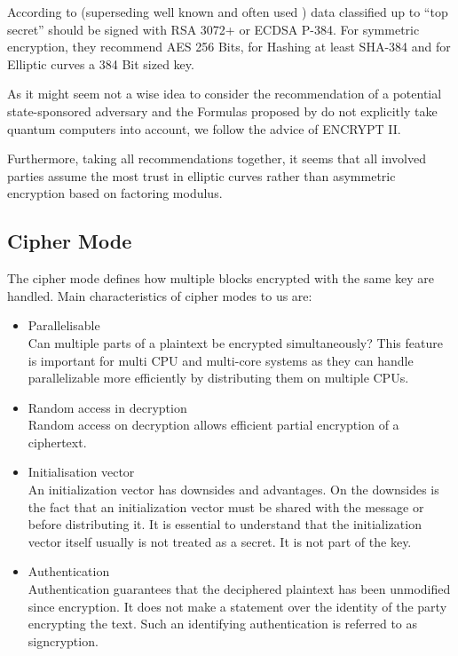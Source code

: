 According to \cite{CNSASuite} (superseding well known and often used \cite{nsa-fact-sheet-B}) data classified up to ``top secret'' should be signed with RSA 3072+ or ECDSA P-384.  For symmetric encryption, they recommend AES 256 Bits, for Hashing at least SHA-384 and for Elliptic curves a 384 Bit sized key.

As it might seem not a wise idea to consider the recommendation of a potential state-sponsored adversary and the Formulas proposed by \citeauthor{Lenstra04keylength.} do not explicitly take quantum computers into account, we follow the advice of ENCRYPT II.

Furthermore, taking all recommendations together, it seems that all involved parties assume the most trust in elliptic curves rather than asymmetric encryption based on factoring modulus.

\subsection{Cipher Mode}
The cipher mode defines how multiple blocks encrypted with the same key are handled. Main characteristics of cipher modes to us are:
\begin{itemize}
	\item Parallelisable\\ 
	Can multiple parts of a plaintext be encrypted simultaneously? This feature is important for multi CPU and multi-core systems as they can handle parallelizable more efficiently by distributing them on multiple CPUs.
	\item Random access in decryption\\
	Random access on decryption allows efficient partial encryption of a ciphertext.
	\item Initialisation vector\\
	An initialization vector has downsides and advantages. On the downsides is the fact that an initialization vector must be shared with the message or before distributing it. It is essential to understand that the initialization vector itself usually is not treated as a secret. It is not part of the key.
	\item Authentication\\
	Authentication guarantees that the deciphered plaintext has been unmodified since encryption. It does not make a statement over the identity of the party encrypting the text. Such an identifying authentication is referred to as signcryption.
\end{itemize}

